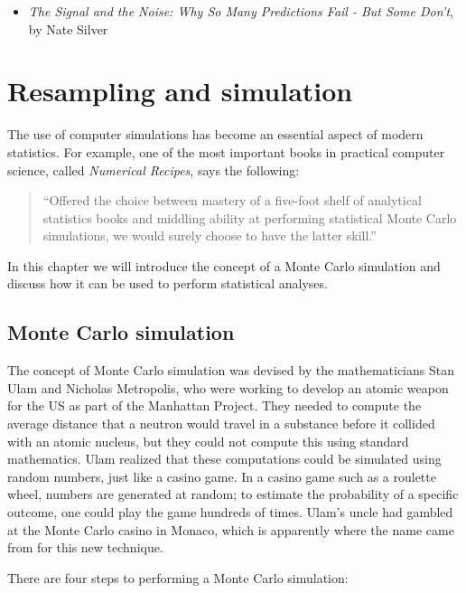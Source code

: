 \documentclass[12pt,]{book}
\providecommand{\tightlist}{%
  \setlength{\itemsep}{0pt}\setlength{\parskip}{0pt}}
\theoremstyle{definition}
\theoremstyle{definition}
\theoremstyle{definition}
\theoremstyle{remark}
\begin{document}
\begin{itemize}
\tightlist
\item
  \emph{The Signal and the Noise: Why So Many Predictions Fail - But Some Don't}, by Nate Silver
\end{itemize}

\hypertarget{resampling-and-simulation}{%
\chapter{Resampling and simulation}\label{resampling-and-simulation}}

The use of computer simulations has become an essential aspect of modern statistics. For example, one of the most important books in practical computer science, called \emph{Numerical Recipes}, says the following:

\begin{quote}
``Offered the choice between mastery of a five-foot shelf of analytical statistics books and middling ability at performing statistical Monte Carlo simulations, we would surely choose to have the latter skill.''
\end{quote}

In this chapter we will introduce the concept of a Monte Carlo simulation and discuss how it can be used to perform statistical analyses.

\hypertarget{monte-carlo-simulation}{%
\section{Monte Carlo simulation}\label{monte-carlo-simulation}}

The concept of Monte Carlo simulation was devised by the mathematicians Stan Ulam and Nicholas Metropolis, who were working to develop an atomic weapon for the US as part of the Manhattan Project. They needed to compute the average distance that a neutron would travel in a substance before it collided with an atomic nucleus, but they could not compute this using standard mathematics.
Ulam realized that these computations could be simulated using random numbers, just like a casino game. In a casino game such as a roulette wheel, numbers are generated at random; to estimate the probability of a specific outcome, one could play the game hundreds of times. Ulam's uncle had gambled at the Monte Carlo casino in Monaco, which is apparently where the name came from for this new technique.

There are four steps to performing a Monte Carlo simulation:
\end{document}
